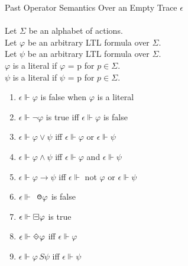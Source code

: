 \begin{definition}Past Operator Semantics Over an Empty Trace $\epsilon$\\
\label{def:Past Empty trace semantics}
\\
Let $\Sigma$ be an alphabet of actions.\\
Let $\varphi$ be an arbitrary LTL formula over $\Sigma$.\\
Let $\psi$ be an arbitrary LTL formula over $\Sigma$.\\
$\varphi$ is a literal if $\varphi$ = p for $ p \in \Sigma $.\\
$\psi$ is a literal if $\psi$ = p for $ p \in \Sigma $.

\begin{enumerate}[start = 19]
\item $\epsilon \Vdash \varphi $ is false when $ \varphi $ is a literal
\item $\epsilon \Vdash \neg\varphi $ is true iff $ \epsilon \Vdash \varphi $ is false
\item $\epsilon \Vdash \varphi \lor \psi $ iff $ \epsilon \Vdash \varphi $ or $ \epsilon \Vdash \psi $
\item $\epsilon \Vdash \varphi \land \psi $ iff $ \epsilon \Vdash \varphi $ and $ \epsilon \Vdash \psi $
\item $\epsilon \Vdash \varphi \rightarrow \psi $ iff $ \epsilon \Vdash $ not $ \varphi $ or $ \epsilon \Vdash \psi $
\item $\epsilon \Vdash \LTLprevious\varphi $ is false
\item $\epsilon \Vdash \LTLalwaysbeen\varphi $ is true
\item $\epsilon \Vdash \LTLonce\varphi $ iff $ \epsilon \Vdash \varphi $
\item $\epsilon \Vdash \varphi \,S \psi $ iff $ \epsilon \Vdash \psi $
\end{enumerate}
\end{definition}

